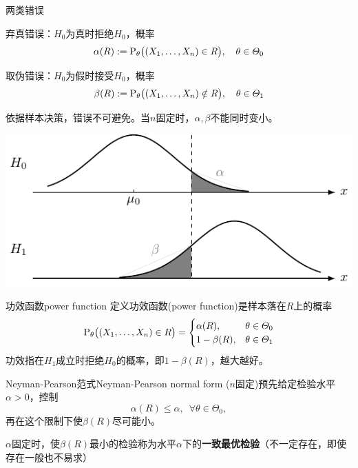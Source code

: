 \begin{definition}{两类错误}{}
	\begin{compactenum}[I]
		\item 弃真错误：$H_0$为真时拒绝$H_0$，概率 
		\begin{equation}
			\alpha(R):=\operatorname{P}_\theta\bigl((X_1,\ldots,X_n)\in R\bigr),\quad \theta\in\varTheta_0
		\end{equation}
		\item 取伪错误：$H_0$为假时接受$H_0$，概率
		\begin{equation}
			\beta(R):=\operatorname{P}_\theta\bigl((X_1,\ldots,X_n)\notin R\bigr),\quad \theta\in\varTheta_1
		\end{equation}
	\end{compactenum}
\end{definition}
依据样本决策，错误不可避免。当$n$固定时，$\alpha,\beta$不能同时变小。
\begin{center}
	\includegraphics{figures/tikz/type-error.pdf}
\end{center}
\begin{definition}{功效函数}{power function}
	定义功效函数(power function)是样本落在$R$上的概率
	\begin{equation}
		\operatorname{P}_\theta\bigl((X_1,\ldots,X_n)\in R\bigr)=\begin{cases}
			\alpha(R),&\theta\in\varTheta_0\\
			1-\beta(R),&\theta\in\varTheta_1
		\end{cases}
	\end{equation}
	功效指在$H_1$成立时拒绝$H_0$的概率，即$1-\beta(R)$，越大越好。
\end{definition}
\begin{theorem}{Neyman-Pearson范式}{Neyman-Pearson normal form}
	($n$固定)预先给定检验水平$\alpha>0$，控制
	\[
		\alpha(R)\leqslant\alpha,\enspace\forall\theta\in\varTheta_0,
	\]
	再在这个限制下使$\beta(R)$尽可能小。
\end{theorem}
$\alpha$固定时，使$\beta(R)$最小的检验称为水平$\alpha$下的\textbf{一致最优检验}（不一定存在，即使存在一般也不易求）



